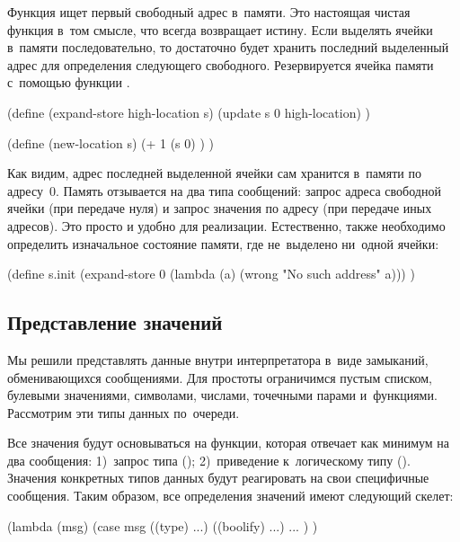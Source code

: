 Функция  ищет первый свободный адрес в~памяти. Это настоящая
чистая функция в~том смысле, что 
всегда возвращает истину. Если выделять ячейки в~памяти последовательно, то
достаточно будет хранить последний выделенный адрес для определения следующего
свободного. Резервируется ячейка памяти с~помощью функции .

\begin{code:lisp}
(define (expand-store high-location s)
  (update s 0 high-location) )

(define (new-location s)
  (+ 1 (s 0) ) )
\end{code:lisp}

Как видим, адрес последней выделенной ячейки сам хранится в~памяти по адресу~0.
Память отзывается на два типа сообщений: запрос адреса свободной ячейки (при
передаче нуля) и запрос значения по адресу (при передаче иных адресов). Это
просто и удобно для реализации. Естественно, также необходимо определить
изначальное состояние памяти, где не~выделено ни~одной ячейки:

\begin{code:lisp}
(define s.init
  (expand-store 0 (lambda (a) (wrong "No such address" a))) )
\end{code:lisp}


\subsection{Представление значений}%
\label{assignment/implementation/ssect:values}

Мы решили представлять данные внутри интерпретатора в~виде замыканий,
обменивающихся сообщениями. Для простоты ограничимся пустым списком, булевыми
значениями, символами, числами, точечными парами и~функциями. Рассмотрим эти
типы данных по~очереди.

Все значения будут основываться на функции, которая отвечает как минимум на два
сообщения: 1)~запрос типа (); 2)~приведение к~логическому типу
(). Значения конкретных типов данных будут реагировать на свои
специфичные сообщения. Таким образом, все определения значений имеют следующий
скелет:

\begin{code:lisp}
(lambda (msg)
  (case msg
    ((type)    ...)
    ((boolify) ...)
    ... ) )
\end{code:lisp}

